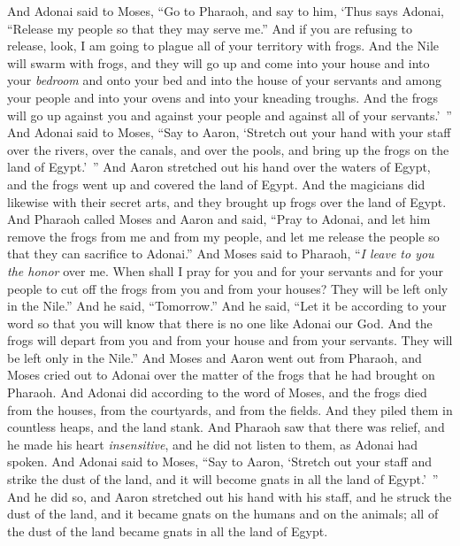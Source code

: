 \begin{biblechapter} %
  And Adonai said to Moses, “Go to Pharaoh, and say to him, ‘Thus says Adonai, “Release my people so that they may serve me.”
\verse And if you are refusing to release, look, I am going to plague all of your territory with frogs.
\verse And the Nile will swarm with frogs, and they will go up and come into your house and into your \textit{bedroom} and onto your bed and into the house of your servants and among your people and into your ovens and into your kneading troughs.
\verse And the frogs will go up against you and against your people and against all of your servants.’ ”
\verse And Adonai said to Moses, “Say to Aaron, ‘Stretch out your hand with your staff over the rivers, over the canals, and over the pools, and bring up the frogs on the land of Egypt.’ ”
\verse And Aaron stretched out his hand over the waters of Egypt, and the frogs went up and covered the land of Egypt.
\verse And the magicians did likewise with their secret arts, and they brought up frogs over the land of Egypt.
\verse And Pharaoh called Moses and Aaron and said, “Pray to Adonai, and let him remove the frogs from me and from my people, and let me release the people so that they can sacrifice to Adonai.”
\verse And Moses said to Pharaoh, “\textit{I leave to you the honor} over me. When shall I pray for you and for your servants and for your people to cut off the frogs from you and from your houses? They will be left only in the Nile.”
\verse And he said, “Tomorrow.” And he said, “Let it be according to your word so that you will know that there is no one like Adonai our God.
\verse And the frogs will depart from you and from your house and from your servants. They will be left only in the Nile.”
\verse And Moses and Aaron went out from Pharaoh, and Moses cried out to Adonai over the matter of the frogs that he had brought on Pharaoh.
\verse And Adonai did according to the word of Moses, and the frogs died from the houses, from the courtyards, and from the fields.
\verse And they piled them in countless heaps, and the land stank.
\verse And Pharaoh saw that there was relief, and he made his heart \textit{insensitive}, and he did not listen to them, as Adonai had spoken.
 And Adonai said to Moses, “Say to Aaron, ‘Stretch out your staff and strike the dust of the land, and it will become gnats in all the land of Egypt.’ ”
\verse And he did so, and Aaron stretched out his hand with his staff, and he struck the dust of the land, and it became gnats on the humans and on the animals; all of the dust of the land became gnats in all the land of Egypt.

\end{biblechapter}
